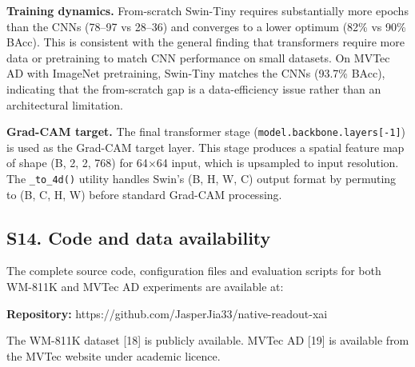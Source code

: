 \documentclass[11pt,a4paper]{article}
\begin{document}
\textbf{Training dynamics.} From-scratch Swin-Tiny requires substantially more epochs than the CNNs (78--97 vs 28--36) and converges to a lower optimum (82\% vs 90\% BAcc). This is consistent with the general finding that transformers require more data or pretraining to match CNN performance on small datasets. On MVTec AD with ImageNet pretraining, Swin-Tiny matches the CNNs (93.7\% BAcc), indicating that the from-scratch gap is a data-efficiency issue rather than an architectural limitation.

\textbf{Grad-CAM target.} The final transformer stage (\texttt{model.backbone.layers[-1]}) is used as the Grad-CAM target layer. This stage produces a spatial feature map of shape (B, 2, 2, 768) for 64$\times$64 input, which is upsampled to input resolution. The \texttt{\_to\_4d()} utility handles Swin's (B, H, W, C) output format by permuting to (B, C, H, W) before standard Grad-CAM processing.

\subsection*{S14. Code and data availability}

The complete source code, configuration files and evaluation scripts for both WM-811K and MVTec AD experiments are available at:

\textbf{Repository:} https://github.com/JasperJia33/native-readout-xai

The WM-811K dataset [18] is publicly available. MVTec AD [19] is available from the MVTec website under academic licence.
\end{document}
